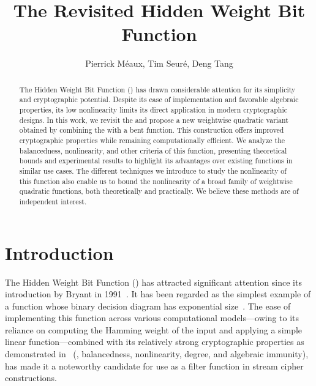 \documentclass{llncs}
\begin{document}
\setcounter{page}{1}

\title{The Revisited Hidden Weight Bit Function}

\ifnum{}
	\author{%
		Pierrick M\'eaux,
		Tim Seuré, 
		Deng Tang
	}
\else
	\author{}
	\institute{}
\fi

\maketitle	
	
\begin{abstract}
	The Hidden Weight Bit Function (\hwbf{}) has drawn considerable attention for its simplicity and cryptographic potential. 
	Despite its ease of implementation and favorable algebraic properties, its low nonlinearity limits its direct application in modern cryptographic designs. In this work, we revisit the \hwbf{} and propose a new weightwise quadratic variant obtained by combining the \hwbf{} with a bent function. 
	This construction offers improved cryptographic properties while remaining computationally efficient. We analyze the balancedness, nonlinearity, and other criteria of this function, presenting theoretical bounds and experimental results to highlight its advantages over existing functions in similar use cases. The different techniques we introduce to study the nonlinearity of this function also enable us to bound the nonlinearity of a broad family of weightwise quadratic functions, both theoretically and practically. We believe these methods are of independent interest.

\end{abstract}

\section{Introduction}

The Hidden Weight Bit Function (\hwbf{}) has attracted significant attention since its introduction by Bryant in 1991~\cite{IEEE:Bryant91}. It has been regarded as the simplest example of a function whose binary decision diagram has exponential size~\cite{IEEE:Bryant91,TIA:BoLSW99}. The ease of implementing this function across various computational models—owing to its reliance on computing the Hamming weight of the input and applying a simple linear function—combined with its relatively strong cryptographic properties as demonstrated in~\cite{DAM:WCST14} (\eg, balancedness, nonlinearity, degree, and algebraic immunity), has made it a noteworthy candidate for use as a filter function in stream cipher constructions.
\end{document}
